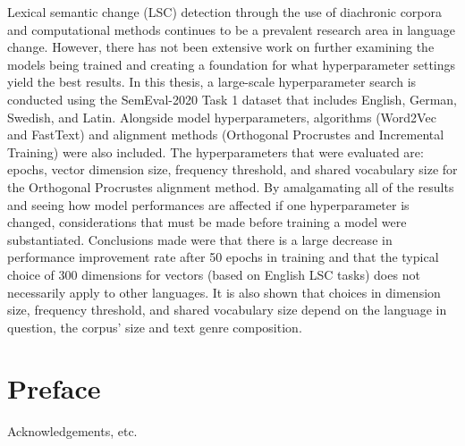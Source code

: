 \documentclass[11pt, a4paper]{article}
\begin{document}
Lexical semantic change (LSC) detection through the use of diachronic corpora and computational methods continues to be a prevalent research area in language change. However, there has not been extensive work on further examining the models being trained and creating a foundation for what hyperparameter settings yield the best results.  In this thesis,  a large-scale hyperparameter search is conducted using the SemEval-2020 Task 1 dataset that includes English, German, Swedish, and Latin. Alongside model hyperparameters, algorithms (Word2Vec and FastText) and alignment methods (Orthogonal Procrustes and Incremental Training) were also included. The hyperparameters that were evaluated are: epochs, vector dimension size, frequency threshold, and shared vocabulary size for the Orthogonal Procrustes alignment method. By amalgamating all of the results and seeing how model performances are affected if one hyperparameter is changed, considerations that must be made before training a model were substantiated. Conclusions made were that there is a large decrease in performance improvement rate after 50 epochs in training and that the typical choice of 300 dimensions for vectors (based on English LSC tasks) does not necessarily apply to other languages. It is also shown that choices in dimension size, frequency threshold, and shared vocabulary size depend on the language in question, the corpus' size and text genre composition. 

\thispagestyle{empty}

\newpage
\section*{Preface}

Acknowledgements, etc.

\thispagestyle{empty}

\newpage

\begingroup
\hypersetup{linkcolor=black} %
\begin{spacing}{0.0}
\tableofcontents
\end{spacing}
\endgroup

\thispagestyle{empty}
\end{document}
